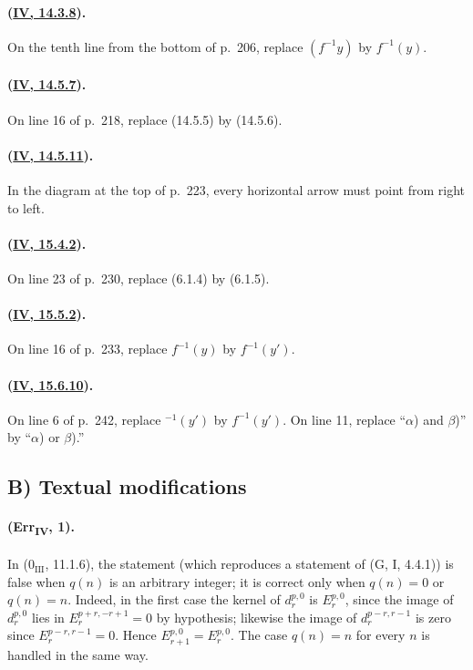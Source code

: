 \paragraph{({\texorpdfstring{\protect\hyperlink{ega4.c04.prop.14-3-8}{IV, 14.3.8}}{IV, 14.3.8}}).}
On the tenth line from the bottom of p.~206, replace $(f^{-1}y)$ by
$f^{-1}(y)$.

\paragraph{({\texorpdfstring{\protect\hyperlink{ega4.c04.rem.14-5-7}{IV, 14.5.7}}{IV, 14.5.7}}).}
On line 16 of p.~218, replace (14.5.5) by (14.5.6).

\paragraph{({\texorpdfstring{\protect\hyperlink{ega4.c04.cor.14-5-11}{IV, 14.5.11}}{IV, 14.5.11}}).}
In the diagram at the top of p.~223, every horizontal arrow must point
from right to left.

\paragraph{({\texorpdfstring{\protect\hyperlink{ega4.c04.prop.15-4-2}{IV, 15.4.2}}{IV, 15.4.2}}).}
On line 23 of p.~230, replace (6.1.4) by (6.1.5).

\paragraph{({\texorpdfstring{\protect\hyperlink{ega4.c04.cor.15-5-2}{IV, 15.5.2}}{IV, 15.5.2}}).}
On line 16 of p.~233, replace $f^{-1}(y)$ by $f^{-1}(y')$.

\paragraph{({\texorpdfstring{\protect\hyperlink{ega4.c04.item.15-6-10}{IV, 15.6.10}}{IV, 15.6.10}}).}
On line 6 of p.~242, replace ${}^{-1}(y')$ by $f^{-1}(y')$.  On line
11, replace ``$\alpha$) and $\beta$)'' by ``$\alpha$) or $\beta$).''

\subsection*{B) Textual modifications}

\paragraph{(Err\textsubscript{IV}, 1).}
In ($0_{\mathrm{III}}$, 11.1.6), the statement (which reproduces a
statement of (G, I, 4.4.1)) is false when $q(n)$ is an arbitrary integer;
it is correct only when $q(n)=0$ or $q(n)=n$.  Indeed, in the first case
the kernel of $d_r^{p,0}$ is $E_r^{p,0}$, since the image of
$d_r^{p,0}$ lies in $E_r^{p+r,-r+1}=0$ by hypothesis; likewise the
image of $d_r^{p-r,r-1}$ is zero since $E_r^{p-r,r-1}=0$.  Hence
$E_{r+1}^{p,0}=E_r^{p,0}$.  The case $q(n)=n$ for every $n$ is handled
in the same way.

